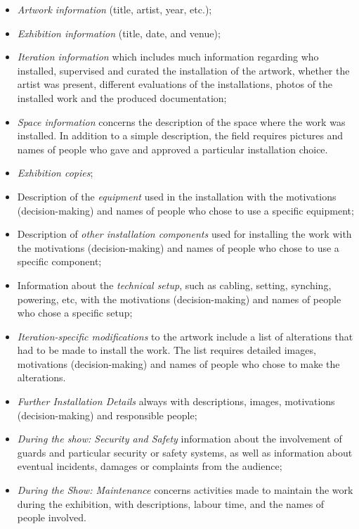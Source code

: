 \begin{itemize}
    \item \textit{Artwork information} (title, artist, year, etc.);
    \item \textit{Exhibition information} (title, date, and venue);
    \item \textit{Iteration information} which includes much information regarding who installed, supervised and curated the installation of the artwork, whether the artist was present, different evaluations of the installations, photos of the installed work and the produced documentation; 
    \item \textit{Space information }concerns the description of the space where the work was installed. In addition to a simple description, the field requires pictures and names of people who gave and approved a particular installation choice. 
    \item \textit{Exhibition copies};
    \item Description of the \textit{equipment} used in the installation with the motivations (decision-making) and names of people who chose to use a specific equipment; 
    \item Description of \textit{other installation components} used for installing the work with the motivations (decision-making) and names of people who chose to use a specific component;
    \item Information about the \textit{technical setup}, such as cabling, setting, synching, powering, etc, with the motivations (decision-making) and names of people who chose a specific setup;
    \item \textit{Iteration-specific modifications} to the artwork include a list of alterations that had to be made to install the work. The list requires detailed images, motivations (decision-making) and names of people who chose to make the alterations. 
    \item \textit{Further Installation Details} always with descriptions, images, motivations (decision-making) and responsible people;
    \item \textit{During the show: Security and Safety} information about the involvement of guards and particular security or safety systems, as well as information about eventual incidents, damages or complaints from the audience;
    \item \textit{During the Show: Maintenance} concerns activities made to maintain the work during the exhibition, with descriptions, labour time, and the names of people involved.

\end{itemize}

